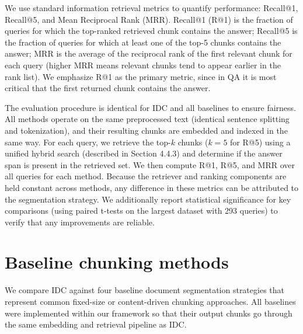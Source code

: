 \documentclass[12pt,a4paper]{report}
\begin{document}
We use standard information retrieval metrics to quantify performance: Recall@1, Recall@5, and Mean Reciprocal Rank (MRR). Recall@1 (R@1) is the fraction of queries for which the top-ranked retrieved chunk contains the answer; Recall@5 is the fraction of queries for which at least one of the top-5 chunks contains the answer; MRR is the average of the reciprocal rank of the first relevant chunk for each query (higher MRR means relevant chunks tend to appear earlier in the rank list). We emphasize R@1 as the primary metric, since in QA it is most critical that the first returned chunk contains the answer.

The evaluation procedure is identical for IDC and all baselines to ensure fairness. All methods operate on the same preprocessed text (identical sentence splitting and tokenization), and their resulting chunks are embedded and indexed in the same way. For each query, we retrieve the top-$k$ chunks ($k=5$ for R@5) using a unified hybrid search (described in Section 4.4.3) and determine if the answer span is present in the retrieved set. We then compute R@1, R@5, and MRR over all queries for each method. Because the retriever and ranking components are held constant across methods, any difference in these metrics can be attributed to the segmentation strategy. We additionally report statistical significance for key comparisons (using paired t-tests on the largest dataset with 293 queries) to verify that any improvements are reliable.

\section{Baseline chunking methods}

We compare IDC against four baseline document segmentation strategies that represent common fixed-size or content-driven chunking approaches. All baselines were implemented within our framework so that their output chunks go through the same embedding and retrieval pipeline as IDC.
\end{document}
